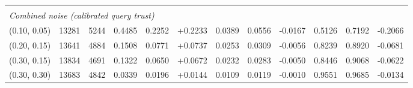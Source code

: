 \begin{table}[ht]
\begin{tabular}{lccccccccccc}
\midrule \\
\multicolumn{12}{l}{\textit{Combined noise (calibrated query trust)}} \\
(0.10, 0.05) & 13281 & 5244 & 0.4485 & 0.2252 & +0.2233 & 0.0389 & 0.0556 & -0.0167 & 0.5126 & 0.7192 & -0.2066 \\
(0.20, 0.15) & 13641 & 4884 & 0.1508 & 0.0771 & +0.0737 & 0.0253 & 0.0309 & -0.0056 & 0.8239 & 0.8920 & -0.0681 \\
(0.30, 0.15) & 13834 & 4691 & 0.1322 & 0.0650 & +0.0672 & 0.0232 & 0.0283 & -0.0050 & 0.8446 & 0.9068 & -0.0622 \\
(0.30, 0.30) & 13683 & 4842 & 0.0339 & 0.0196 & +0.0144 & 0.0109 & 0.0119 & -0.0010 & 0.9551 & 0.9685 & -0.0134 \\
\bottomrule
\end{tabular}
\end{table}